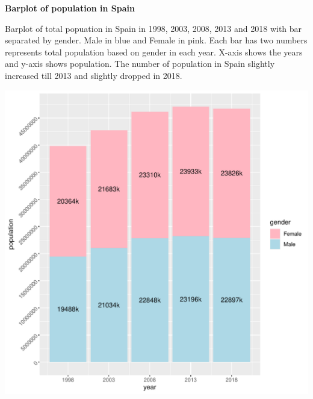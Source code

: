 \documentclass[12pt, oneside]{report}\usepackage[]{graphicx}\usepackage[]{color}
\makeatletter
\def\maxwidth{ %
  \ifdim\Gin@nat@width>\linewidth
    \linewidth
  \else
    \Gin@nat@width
  \fi
}
\makeatother
\begin{document}
\newpage
\begin{center}
\textbf {Barplot of population in Spain} \\
\end{center}
Barplot of total popuation in Spain in 1998, 2003, 2008, 2013 and 2018 with bar separated by gender. Male in blue and Female in pink. Each bar has two numbers represents total population based on gender in each year. X-axis shows the years and y-axis shows population. The number of population in Spain slightly increased till 2013 and slightly dropped in 2018.
\begin{Schunk}

\includegraphics[width=\maxwidth]{figure/unnamed-chunk-15-1} \end{Schunk}
\end{document}
